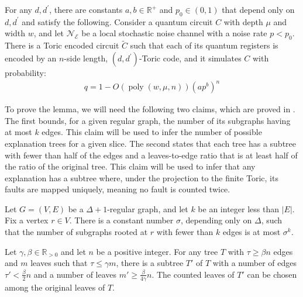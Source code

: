   \begin{lemma}
    \label{lemma:keylemma}
For any $d, d^{\prime}$, there are constants $a, b \in \mathbb{R}^{+}$ and $p_{0} \in (0,1)$ that depend only on $d, d^{\prime}$ and satisfy the following. Consider a quantum circuit $C$ with depth $\mu$ and width $w$, and let $\mathcal{N}_{\mathcal{E}}$ be a local stochastic noise channel with a noise rate $p < p_{0}$. There is a Toric encoded circuit $\tilde{C}$ such that each of its quantum registers is encoded by an $n$-side length, $(d, d^{\prime})$-Toric code, and it simulates $C$ with probability:
\begin{equation*}
  \begin{split}
    q = 1 -   O \left( \operatorname{poly}(w,\mu,n) \right) \left( a p^{b} \right)^{n} 
  \end{split}
\end{equation*}
\end{lemma}


To prove the lemma, we will need the following two claims, which are proved in \cite{Berman, gacs2021newversiontoomsproof}. The first bounds, for a given regular graph, the number of its subgraphs having at most $k$ edges. This claim will be used to infer the number of possible explanation trees for a given slice. The second states that each tree has a subtree with fewer than half of the edges and a leaves-to-edge ratio that is at least half of the ratio of the original tree. This claim will be used to infer that any explanation has a subtree where, under the projection to the finite Toric, its faults are mapped uniquely, meaning no fault is counted twice. 

\begin{claim*}
Let $G = \left( V, E \right)$ be a $\Delta + 1$-regular graph, and let $k$ be an integer less than $|E|$. Fix a vertex $r \in V$. There is a constant number $\sigma$, depending only on $\Delta$, such that the number of subgraphs rooted at $r$ with fewer than $k$ edges is at most $\sigma^{k}$.
  \end{claim*}

  \begin{claim*}
  Let $\gamma,\beta\in\mathbb{R}_{>0}$ and let $n$ be a positive
  integer. For any tree $T$ with $\tau\ge\beta n$ edges and $m$ leaves
  such that $\tau\le\gamma m$, there is a subtree $T'$ of $T$ with a
  number of edges $\tau'<\frac{\beta}{2}n$ and a number of leaves
  $m'\ge\frac{\beta}{4\gamma}n$. The counted leaves of $T'$ can be
  chosen among the original leaves of $T$.
  \end{claim*}
  
